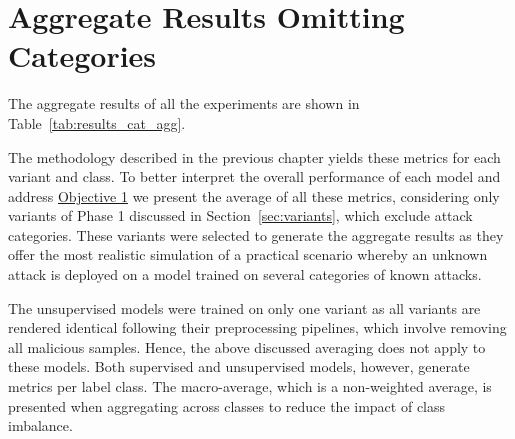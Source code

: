 \section{Aggregate Results Omitting Categories}%
\label{sec:agg_res_cat}

The aggregate results of all the experiments are shown in
Table~\ref{tab:results_cat_agg}.

The methodology described in the previous chapter yields these metrics for each
variant and class. To better interpret the overall performance of each model
and address \hyperlink{obj}{Objective 1} we present the average of all these
metrics, considering only variants of Phase 1 discussed in
Section~\ref{sec:variants}, which exclude attack categories. These variants
were selected to generate the aggregate results as they offer the most
realistic simulation of a practical scenario whereby an unknown attack is
deployed on a model trained on several categories of known attacks.

The unsupervised models were trained on only one variant as all variants are
rendered identical following their preprocessing pipelines, which involve
removing all malicious samples. Hence, the above discussed averaging does not
apply to these models. Both supervised and unsupervised models, however,
generate metrics per label class. The macro-average, which is a non-weighted
average, is presented when aggregating across classes to reduce the impact of
class imbalance.

